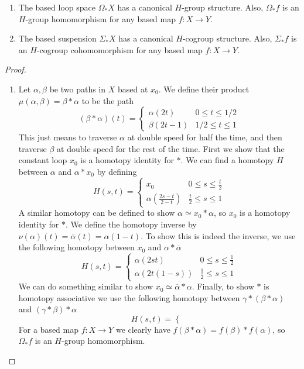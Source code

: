 \begin{prop}
\sloppyspace
\begin{enumerate}
	\item The based loop space $\Omega_* X$ has a canonical $H$-group structure. Also, $\Omega_* f$ is an $H$-group homomorphism for any based map $f : X \rightarrow Y$.
	\item The based suspension $\Sigma_* X$ has a canonical $H$-cogroup structure. Also, $\Sigma_* f$ is an $H$-cogroup cohomomorphism for any based map $f : X \rightarrow Y$.
\end{enumerate}
\end{prop}
\begin{proof}
\sloppyspace
\begin{enumerate}

	\item Let $\alpha,\beta$ be two paths in $X$ based at $x_0$. We define their product $\mu(\alpha,\beta) = \beta * \alpha$ to be the path
	\[ (\beta * \alpha)(t) = \begin{cases} \alpha(2t) & 0 \leq t \leq 1/2 \\ \beta(2t-1) & 1/2 \leq t \leq 1 \end{cases} \]
	This just means to traverse $\alpha$ at double speed for half the time, and then traverse $\beta$ at double speed for the rest of the time. First we show that the constant loop $x_0$ is a homotopy identity for $*$. We can find a homotopy $H$ between $\alpha$ and $\alpha * x_0$ by defining
	\[ H(s,t) = \begin{cases} x_0 & 0 \leq s \leq \frac{t}{2} \\ \alpha\left( \frac{2s-t}{2-t} \right) & \frac{t}{2} \leq s \leq 1 \end{cases} \]
	A similar homotopy can be defined to show $\alpha \simeq x_0 * \alpha$, so $x_0$ is a homotopy identity for $*$. We define the homotopy inverse by $\nu(\alpha)(t) = \overline{\alpha}(t) = \alpha(1-t)$. To show this is indeed the inverse, we use the following homotopy between $x_0$ and $\alpha * \overline\alpha$
	\[ H(s,t) = \begin{cases} \alpha(2st) & 0 \leq s \leq \frac{1}{2} \\ \alpha(2t(1-s)) & \frac{1}{2} \leq s \leq 1 \end{cases} \]
	We can do something similar to show $x_0 \simeq \overline\alpha * \alpha$. Finally, to show $*$ is homotopy associative we use the following homotopy between $\gamma * (\beta * \alpha)$ and $(\gamma * \beta) * \alpha$
	\[ H(s,t) = \begin{cases} \end{cases} \]
	For a based map $f : X \rightarrow Y$ we clearly have $f(\beta*\alpha) = f(\beta) * f(\alpha)$, so $\Omega_* f$ is an $H$-group homomorphism.
	

\end{enumerate}
\end{proof}
